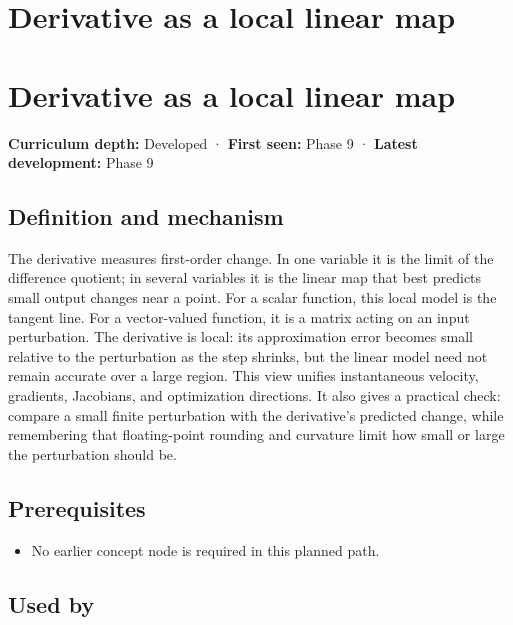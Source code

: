 \hypertarget{appendix-7bc181935c42}{}
\section*{Derivative as a local linear map}
\section{Derivative as a local linear map}\label{derivative-as-a-local-linear-map}

\textbf{Curriculum depth:} Developed · \textbf{First seen:} Phase 9 · \textbf{Latest development:} Phase 9

\subsection{Definition and mechanism}\label{definition-and-mechanism}

The derivative measures first-order change. In one variable it is the limit of the difference quotient; in several variables it is the linear map that best predicts small output changes near a point. For a scalar function, this local model is the tangent line. For a vector-valued function, it is a matrix acting on an input perturbation. The derivative is local: its approximation error becomes small relative to the perturbation as the step shrinks, but the linear model need not remain accurate over a large region. This view unifies instantaneous velocity, gradients, Jacobians, and optimization directions. It also gives a practical check: compare a small finite perturbation with the derivative's predicted change, while remembering that floating-point rounding and curvature limit how small or large the perturbation should be.

\subsection{Prerequisites}\label{prerequisites}

\begin{itemize}
\tightlist
\item
  No earlier concept node is required in this planned path.
\end{itemize}

\subsection{Used by}\label{used-by}

